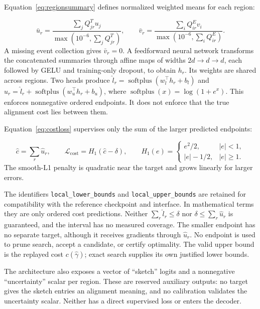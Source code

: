 \begin{revised}Equation~\eqref{eq:regionsummary} defines normalized weighted means for each region:\end{revised}
\begin{equation}
 \bar u_r=\frac{\sum_jQ^T_{jr}u_j}{\max(10^{-6},\sum_jQ^T_{jr})},\qquad
 \bar v_r=\frac{\sum_iQ^E_{ir}v_i}{\max(10^{-6},\sum_iQ^E_{ir})}.\label{eq:regionsummary}
\end{equation}
A missing event collection gives $\bar v_r=0$. A feedforward neural network transforms the concatenated summaries through affine maps of widths $2d\to d\to d$, each followed by GELU and training-only dropout, to obtain $h_r$. Its weights are shared across regions. Two heads produce $\widehat l_r=\operatorname{softplus}(w_l^\top h_r+b_l)$ and $\widehat u_r=\widehat l_r+\operatorname{softplus}(w_u^\top h_r+b_u)$, where $\operatorname{softplus}(x)=\log(1+e^x)$. This enforces nonnegative ordered endpoints. It does not enforce that the true alignment cost lies between them. \begin{revised}Equation~\eqref{eq:costloss} supervises only the sum of the larger predicted endpoints:\end{revised}
\begin{equation}
 \widehat c=\sum_r\widehat u_r,\qquad
 \mathcal L_{\mathrm{cost}}=H_1(\widehat c-\delta),\qquad
 H_1(e)=\begin{cases}e^2/2,&|e|<1,\\|e|-1/2,&|e|\geq1.\end{cases}
 \label{eq:costloss}
\end{equation}
The smooth-L1 penalty is quadratic near the target and grows linearly for larger errors. \begin{revised}The identifiers \texttt{local\_lower\_bounds} and \texttt{local\_upper\_bounds} are retained for compatibility with the reference checkpoint and interface. In mathematical terms they are only ordered cost predictions. Neither $\sum_r\widehat l_r\leq\delta$ nor $\delta\leq\sum_r\widehat u_r$ is guaranteed, and the interval has no measured coverage. The smaller endpoint has no separate target, although it receives gradients through $\widehat u_r$. No endpoint is used to prune search, accept a candidate, or certify optimality. The valid upper bound is the replayed cost $c(\widehat\gamma)$; exact search supplies its own justified lower bounds.\end{revised} The architecture also exposes a vector of ``sketch'' logits and a nonnegative ``uncertainty'' scalar per region. These are reserved auxiliary outputs: no target gives the sketch entries an alignment meaning, and no calibration validates the uncertainty scalar. Neither has a direct supervised loss or enters the decoder.

